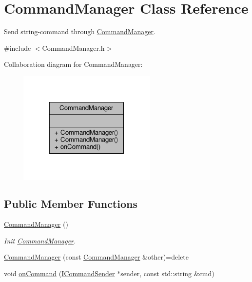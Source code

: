 \hypertarget{class_command_manager}{\section{Command\-Manager Class Reference}
\label{class_command_manager}
}


Send string-\/command through \hyperlink{class_command_manager}{Command\-Manager}.  




{\ttfamily \#include $<$Command\-Manager.\-h$>$}



Collaboration diagram for Command\-Manager\-:
\nopagebreak
\begin{figure}[H]
\begin{center}
\leavevmode
\includegraphics[width=194pt]{class_command_manager__coll__graph}
\end{center}
\end{figure}
\subsection*{Public Member Functions}
\begin{DoxyCompactItemize}
\item 
\hyperlink{class_command_manager_a8a13226bf933396a3f35dfb5bee3e813}{Command\-Manager} ()
\begin{DoxyCompactList}\small\item\em Init \hyperlink{class_command_manager}{Command\-Manager}. \end{DoxyCompactList}\item 
\hyperlink{class_command_manager_aeaffe7fa7dd8f1dd45b642120013a076}{Command\-Manager} (const \hyperlink{class_command_manager}{Command\-Manager} \&other)=delete
\item 
void \hyperlink{class_command_manager_abef8721bbe32e1ecb22f2f3d3b8c0601}{on\-Command} (\hyperlink{class_i_command_sender}{I\-Command\-Sender} $\ast$sender, const std\-::string \&cmd)
\end{DoxyCompactItemize}


